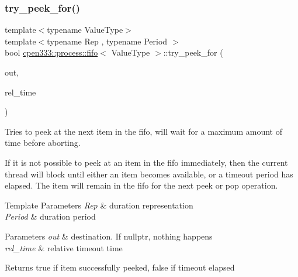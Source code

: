 \subsubsection{\texorpdfstring{try\+\_\+peek\+\_\+for()}{try\_peek\_for()}}
{\footnotesize\ttfamily template$<$typename Value\+Type$>$ \\
template$<$typename Rep , typename Period $>$ \\
bool \hyperlink{classcpen333_1_1process_1_1fifo}{cpen333\+::process\+::fifo}$<$ Value\+Type $>$\+::try\+\_\+peek\+\_\+for (\begin{DoxyParamCaption}\item[{Value\+Type $\ast$}]{out,  }\item[{std\+::chrono\+::duration$<$ Rep, Period $>$ \&}]{rel\+\_\+time }\end{DoxyParamCaption})\hspace{0.3cm}{\ttfamily [inline]}}



Tries to peek at the next item in the fifo, will wait for a maximum amount of time before aborting. 

If it is not possible to peek at an item in the fifo immediately, then the current thread will block until either an item becomes available, or a timeout period has elapsed. The item will remain in the fifo for the next {\ttfamily peek} or {\ttfamily pop} operation.


\begin{DoxyTemplParams}{Template Parameters}
{\em Rep} & duration representation \\
\hline
{\em Period} & duration period \\
\hline
\end{DoxyTemplParams}

\begin{DoxyParams}{Parameters}
{\em out} & destination. If {\ttfamily nullptr}, nothing happens \\
\hline
{\em rel\+\_\+time} & relative timeout time \\
\hline
\end{DoxyParams}
\begin{DoxyReturn}{Returns}
{\ttfamily true} if item successfully peeked, {\ttfamily false} if timeout elapsed 
\end{DoxyReturn}
\mbox{\label{classcpen333_1_1process_1_1fifo_ac587ec4df8ae29b25a3e21ac7114e335}} 
